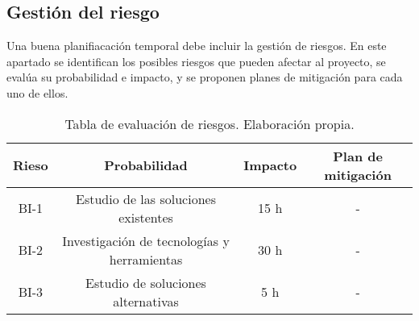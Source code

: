 \subsection{Gestión del riesgo}

Una buena planifiacación temporal debe incluir la gestión de riesgos. En este apartado se identifican 
los posibles riesgos que pueden afectar al proyecto, se evalúa su probabilidad e impacto, y se proponen 
planes de mitigación para cada uno de ellos.

\begin{table}[H]
    \centering
    \begin{tabular}{|c|c|c|c|}
        \hline
        \textbf{Rieso} & \textbf{Probabilidad} & \textbf{Impacto} & \textbf{Plan de mitigación} \\
        \hline
        BI-1 & Estudio de las soluciones existentes & 15 h & - \\
        BI-2 & Investigación de tecnologías y herramientas & 30 h & - \\
        BI-3 & Estudio de soluciones alternativas & 5 h & - \\
        
        \hline
    \end{tabular}
    \caption{Tabla de evaluación de riesgos. Elaboración propia.}
    \label{tab:estimaciones}
\end{table}
